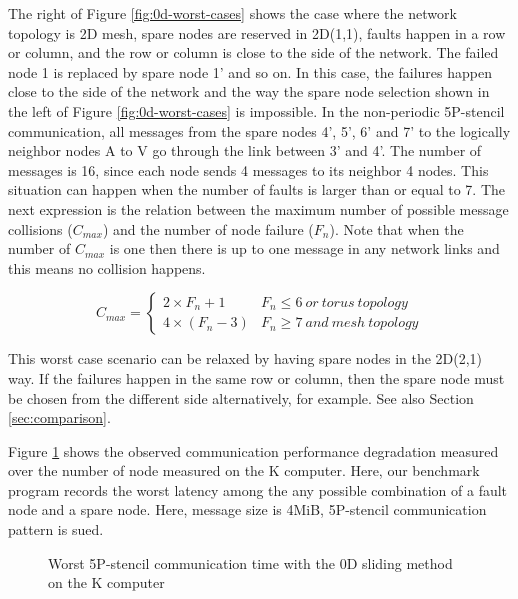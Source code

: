 \documentclass[10pt,conference,a4paper,fleqn]{IEEEtran}
\begin{document}
The right of Figure \ref{fig:0d-worst-cases}  shows the case where the
network topology is 2D mesh, spare nodes are reserved in 2D(1,1),
faults happen in a row or column, and the row or column is close to
the side of the network. The failed node 1 is replaced by spare node
1' and so on. In this case, the failures 
happen close to the side of the network and the way the spare node
selection shown in the left of Figure \ref{fig:0d-worst-cases} is
impossible. In the non-periodic 5P-stencil communication, all messages
from the spare nodes 4', 5', 6' and 7' to the logically neighbor nodes
A to V go through the link between 3' and 4'. The number of messages
is 16, since each node sends 4 messages to its neighbor 4 nodes. This
situation can happen when the number of faults is larger than or equal
to 7. The next expression is the relation between the maximum number
of possible message collisions ($C_{max}$) and the number of node
failure ($F_n$). Note that when the number of $C_{max}$ is one then
there is up to one message in any network links and this means no
collision happens.

\begin{equation}
C_{max} = \left \{ \begin{array}{ll}
2 \times F_n + 1 & F_n \leq 6~or~torus~topology \\
4 \times ( F_n - 3 ) & F_n \geq 7~and~mesh~topology
\end{array}\nonumber
\right.
\end{equation}

This worst case scenario can be relaxed by having spare nodes in
the 2D(2,1) way. If the failures happen in the same row or column,
then the spare node must be chosen from the different side
alternatively, for example. See also Section \ref{sec:comparison}.

Figure \ref{fig:0d-K} shows the observed communication performance
degradation measured over the number of node measured on the K
computer. Here, our benchmark program records the worst latency among
the any possible combination of a fault node and a spare node. Here,
message size is 4MiB, 5P-stencil communication pattern is sued.

\begin{figure}[ht]
\begin{center}
  \caption{Worst 5P-stencil communication time with the 0D sliding method
    on the K computer} 
  \label{fig:0d-K}
\end{center}
\end{figure}
\end{document}
